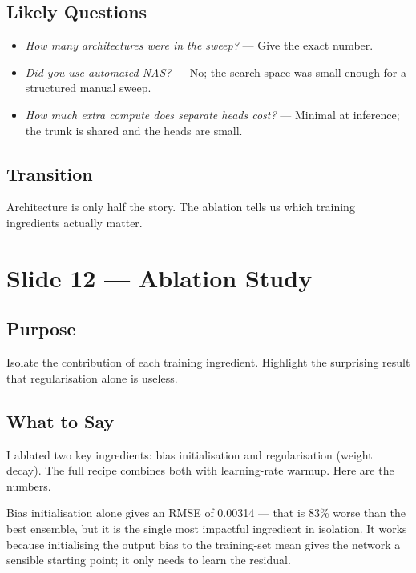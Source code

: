\documentclass[12pt,a4paper]{article}
\begin{document}
\subsection*{Likely Questions}
\begin{itemize}
  \item \emph{How many architectures were in the sweep?}
    --- Give the exact number.
  \item \emph{Did you use automated NAS?}
    --- No; the search space was small enough for a structured manual
    sweep.
  \item \emph{How much extra compute does separate heads cost?}
    --- Minimal at inference; the trunk is shared and the heads are
    small.
\end{itemize}

\subsection*{Transition}
Architecture is only half the story. The ablation tells us which
training ingredients actually matter.

\clearpage

\section{Slide 12 --- Ablation Study}
\label{sec:slide12}

\subsection*{Purpose}
Isolate the contribution of each training ingredient. Highlight the
surprising result that regularisation alone is useless.

\subsection*{What to Say}

I ablated two key ingredients: bias initialisation and regularisation
(weight decay). The full recipe combines both with learning-rate
warmup. Here are the numbers.

Bias initialisation alone gives an RMSE of 0.00314 --- that is 83\%
worse than the best ensemble, but it is the single most impactful
ingredient in isolation. It works because initialising the output
bias to the training-set mean gives the network a sensible starting
point; it only needs to learn the residual.
\end{document}
